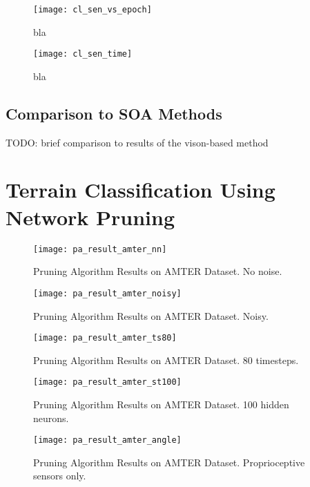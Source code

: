 \begin{figure}[H]
  \centering
  \texttt{[image: cl\_sen\_vs\_epoch]}
  \caption{bla}
  \label{fig:sen_vs_epoch}
\end{figure}

\begin{figure}[H]
  \centering
  \texttt{[image: cl\_sen\_time]}
  \caption{bla}
  \label{fig:sen_time}
\end{figure}

\subsection{Comparison to SOA Methods} \label{ssec:comparison_to_soa}
TODO: brief comparison to results of the vison-based method

\section[Terrain Classification Using Network Pruning]{Terrain Classification Using Network Pruning} \label{sec:pa_amter}

\begin{figure}[H]
  \centering
  \texttt{[image: pa\_result\_amter\_nn]}
  \caption{Pruning Algorithm Results on AMTER Dataset. No noise.}
  \label{fig:pa_result_amter}
\end{figure}

\begin{figure}[H]
  \centering
  \texttt{[image: pa\_result\_amter\_noisy]}
  \caption{Pruning Algorithm Results on AMTER Dataset. Noisy.}
  \label{fig:pa_result_amter_noisy}
\end{figure}

\begin{figure}[H]
  \centering
  \texttt{[image: pa\_result\_amter\_ts80]}
  \caption{Pruning Algorithm Results on AMTER Dataset. 80 timesteps.}
  \label{fig:pa_result_amter_80}
\end{figure}

\begin{figure}[H]
  \centering
  \texttt{[image: pa\_result\_amter\_st100]}
  \caption{Pruning Algorithm Results on AMTER Dataset. 100 hidden neurons.}
  \label{fig:pa_result_amter_st100}
\end{figure}

\begin{figure}[H]
  \centering
  \texttt{[image: pa\_result\_amter\_angle]}
  \caption{Pruning Algorithm Results on AMTER Dataset. Proprioceptive sensors only.}
  \label{fig:pa_result_amter_angle}
\end{figure}

